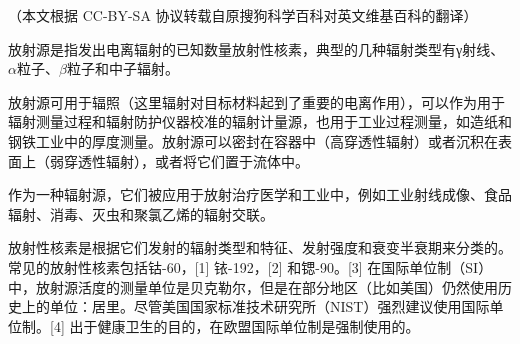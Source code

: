 
（本文根据 CC-BY-SA 协议转载自原搜狗科学百科对英文维基百科的翻译）

放射源是指发出电离辐射的已知数量放射性核素，典型的几种辐射类型有γ射线、$\alpha$粒子、$\beta$粒子和中子辐射。

放射源可用于辐照（这里辐射对目标材料起到了重要的电离作用），可以作为用于辐射测量过程和辐射防护仪器校准的辐射计量源，也用于工业过程测量，如造纸和钢铁工业中的厚度测量。放射源可以密封在容器中（高穿透性辐射）或者沉积在表面上（弱穿透性辐射），或者将它们置于流体中。

作为一种辐射源，它们被应用于放射治疗医学和工业中，例如工业射线成像、食品辐射、消毒、灭虫和聚氯乙烯的辐射交联。

放射性核素是根据它们发射的辐射类型和特征、发射强度和衰变半衰期来分类的。常见的放射性核素包括钴-60，[1] 铱-192，[2] 和锶-90。[3] 在国际单位制（SI）中，放射源活度的测量单位是贝克勒尔，但是在部分地区（比如美国）仍然使用历史上的单位：居里。尽管美国国家标准技术研究所（NIST）强烈建议使用国际单位制。[4] 出于健康卫生的目的，在欧盟国际单位制是强制使用的。